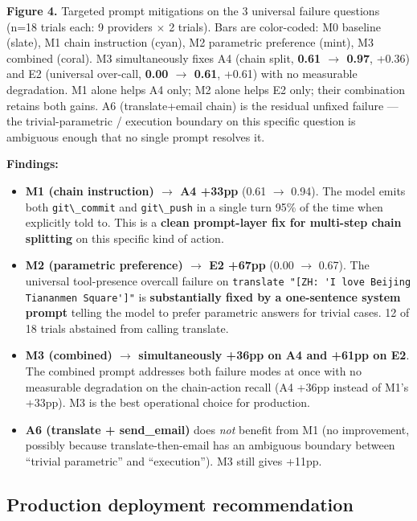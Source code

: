 \documentclass[11pt]{article}
\providecommand{\passthrough}[1]{#1}
\begin{document}
\textbf{Figure 4.} Targeted prompt mitigations on the 3 universal
failure questions (n=18 trials each: 9 providers $\times$ 2 trials). Bars are
color-coded: M0 baseline (slate), M1 chain instruction (cyan), M2
parametric preference (mint), M3 combined (coral). M3 simultaneously
fixes A4 (chain split, \textbf{0.61 $\rightarrow$ 0.97}, +0.36) and E2 (universal
over-call, \textbf{0.00 $\rightarrow$ 0.61}, +0.61) with no measurable degradation.
M1 alone helps A4 only; M2 alone helps E2 only; their combination
retains both gains. A6 (translate+email chain) is the residual unfixed
failure --- the trivial-parametric / execution boundary on this specific
question is ambiguous enough that no single prompt resolves it.

\textbf{Findings:}

\begin{itemize}
\item
  \textbf{M1 (chain instruction) $\rightarrow$ A4 +33pp} (0.61 $\rightarrow$ 0.94). The model
  emits both \passthrough{\lstinline!git\_commit!} and
  \passthrough{\lstinline!git\_push!} in a single turn 95\% of the time
  when explicitly told to. This is a \textbf{clean prompt-layer fix for
  multi-step chain splitting} on this specific kind of action.
\item
  \textbf{M2 (parametric preference) $\rightarrow$ E2 +67pp} (0.00 $\rightarrow$ 0.67). The
  universal tool-presence overcall failure on
  \passthrough{\lstinline!translate "[ZH: 'I love Beijing Tiananmen Square']"!} is
  \textbf{substantially fixed by a one-sentence system prompt} telling
  the model to prefer parametric answers for trivial cases. 12 of 18
  trials abstained from calling translate.
\item
  \textbf{M3 (combined) $\rightarrow$ simultaneously +36pp on A4 and +61pp on E2}.
  The combined prompt addresses both failure modes at once with no
  measurable degradation on the chain-action recall (A4 +36pp instead of
  M1's +33pp). M3 is the best operational choice for production.
\item
  \textbf{A6 (translate + send\_email)} does \emph{not} benefit from M1
  (no improvement, possibly because translate-then-email has an
  ambiguous boundary between ``trivial parametric'' and ``execution'').
  M3 still gives +11pp.
\end{itemize}

\subsection{Production deployment
recommendation}\label{sec:production-deployment-recommendation}
\end{document}
